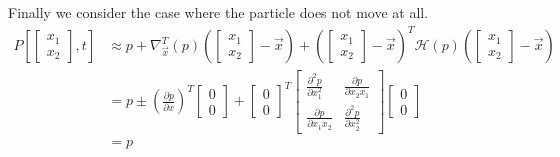 Finally we consider the case where the particle does not move at all.
\begin{align*}
    P\left[\begin{bmatrix} x_1\\x_2 \end{bmatrix}, t\right] &\approx 
    p + 
    \nabla^T_{\vec{x}}(p) \left(\begin{bmatrix} x_1\\x_2 \end{bmatrix} - \vec{x}\right) + \left(\begin{bmatrix} x_1\\x_2 \end{bmatrix} - \vec{x}\right)^T \mathcal{H}(p)  \left(\begin{bmatrix} x_1\\x_2 \end{bmatrix} - \vec{x}\right) \\
    &= p \pm \left(\frac{\partial p}{\partial x}\right)^T \begin{bmatrix} 0\\0 \end{bmatrix} + \begin{bmatrix} 0\\0 \end{bmatrix}^T \begin{bmatrix}
        \frac{\partial^2 p}{\partial x_1^2} & \frac{\partial p}{\partial x_2 x_1} \\
        \frac{\partial p}{\partial x_1 x_2} & \frac{\partial^2 p}{\partial x_2^2}
    \end{bmatrix} \begin{bmatrix} 0\\0 \end{bmatrix} \\
    &= p
\end{align*}

